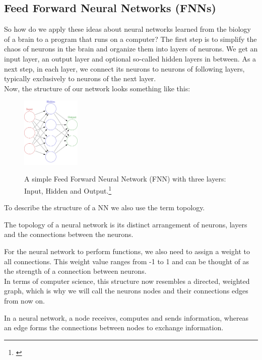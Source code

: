 \documentclass[11pt]{report}
\newcommand{\mydeflabel}{}
\newenvironment{mydef}[1]
 {\renewcommand\mydeflabel{#1}\begin{mydefinner}}
 {\end{mydefinner}}
\begin{document}
            \subsection{Feed Forward Neural Networks (FNNs)}\label{subsec:feed-forward-neural-networks-(fnns)}
    So how do we apply these ideas about neural networks learned from the biology of a brain to a program that runs on a computer?
    The first step is to simplify the chaos of neurons in the brain and organize them into layers of neurons.
    We get an input layer, an output layer and optional so-called hidden layers in between.
    As a next step, in each layer, we connect its neurons to neurons of following layers, typically exclusively to neurons of the next layer.
    \\
    Now, the structure of our network looks something like this:
    \begin{figure}[H]
        \centering
        \includegraphics[width=0.25\textwidth]{nn_simple_1}~\caption{A simple Feed Forward Neural Network (FNN) with three layers: Input, Hidden and Output.\footnote{\cite{nn_simple_img_1}}}
        \label{fig:nn_simple_1}
    \end{figure}
    \noindent
    To describe the structure of a NN we also use the term topology.
    \begin{mydef}{Neural Network Topology}
        The topology of a neural network is its distinct arrangement of neurons, layers and the connections between the neurons.
        \label{definition:Topology}
    \end{mydef}
    \noindent
    For the neural network to perform functions, we also need to assign a weight to all connections.
    This weight value ranges from -1 to 1 and can be thought of as the strength of a connection between neurons.
    \\
    In terms of computer science, this structure now resembles a directed, weighted graph, which is why we will call the neurons nodes and their connections edges from now on.
    \begin{mydef}{Nodes/Edges}
        In a neural network, a node receives, computes and sends information, whereas an edge forms the connections between nodes to exchange information.
        \label{definition:Nodes-Edges}
    \end{mydef}
\end{document}

